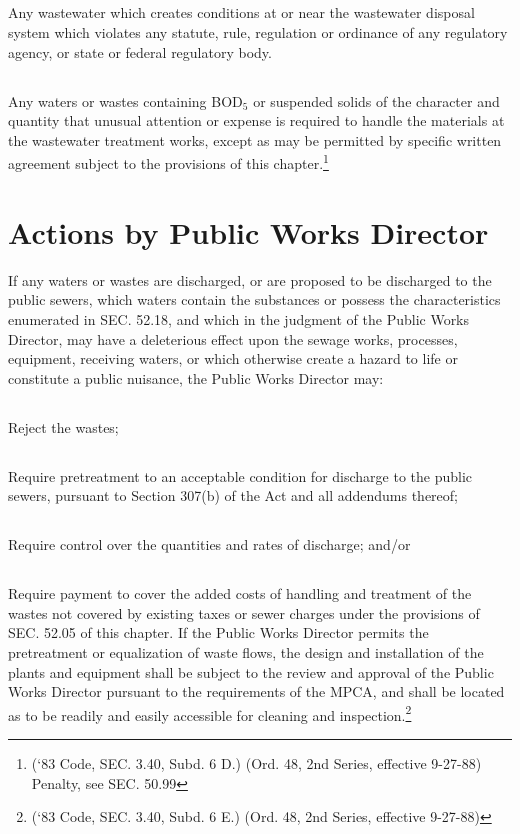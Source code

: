 \subsection{}
Any wastewater which creates conditions at or near the wastewater disposal system which violates any statute, rule, regulation or ordinance of any regulatory agency, or state or federal regulatory body.
\subsection{}
Any waters or wastes containing BOD$_{5}$ or suspended solids of the character and quantity that unusual attention or expense is required to handle the materials at the wastewater treatment works, except as may be permitted by specific written agreement subject to the provisions of this chapter.\footnote{(‘83 Code, SEC. 3.40, Subd. 6 D.) (Ord. 48, 2nd Series, effective 9-27-88) Penalty, see SEC. 50.99}

\section{Actions by Public Works Director}
If any waters or wastes are discharged, or are proposed to be discharged to the public sewers, which waters contain the substances or possess the characteristics enumerated in SEC. 52.18, and which in the judgment of the Public Works Director, may have a deleterious effect upon the sewage works, processes, equipment, receiving waters, or which otherwise create a hazard to life or constitute a public nuisance, the Public Works Director may:
\subsection{}
Reject the wastes;
\subsection{}
Require pretreatment to an acceptable condition for discharge to the public sewers, pursuant to Section 307(b) of the Act and all addendums thereof;
\subsection{}
Require control over the quantities and rates of discharge; and/or
\subsection{}
Require payment to cover the added costs of handling and treatment of the wastes not covered by existing taxes or sewer charges under the provisions of SEC. 52.05 of this chapter.  If the Public Works Director permits the pretreatment or equalization of waste flows, the design and installation of the plants and equipment shall be subject to the review and approval of the Public Works Director pursuant to the requirements of the MPCA, and shall be located as to be readily and easily accessible for cleaning and inspection.\footnote{(‘83 Code, SEC. 3.40, Subd. 6 E.) (Ord. 48, 2nd Series, effective 9-27-88)}

